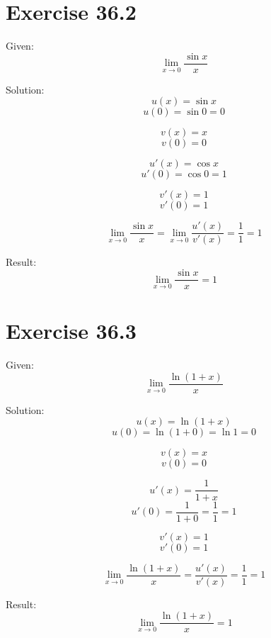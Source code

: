 \documentclass[a4paper, 10pt]{scrartcl}
\begin{document}
\section{Exercise 36.2}

Given:
\[\lim_{x\to 0}{\frac{\sin{x}}{x}}\]

Solution:
\[u(x) = \sin{x}\]
\[u(0) = \sin{0} = 0\]

\[v(x) = x\]
\[v(0) = 0\]

\[u'(x) = \cos{x}\]
\[u'(0) = \cos{0} = 1\]

\[v'(x) = 1\]
\[v'(0) = 1\]

\[\lim_{x\to 0}{\frac{\sin{x}}{x}} = \lim_{x\to 0}{\frac{u'(x)}{v'(x)}} = \frac{1}{1} = 1\]

Result:
\[\lim_{x\to 0}{\frac{\sin{x}}{x}} = 1\]

\section{Exercise 36.3}

Given:
\[\lim_{x\to 0}{\frac{\ln{(1 + x)}}{x}}\]

Solution:
\[u(x) = \ln{(1 + x)}\]
\[u(0) = \ln{(1 + 0)} = \ln{1} = 0\]

\[v(x) = x\]
\[v(0) = 0\]

\[u'(x) = \frac{1}{1 + x}\]
\[u'(0) = \frac{1}{1 + 0} = \frac{1}{1} = 1\]

\[v'(x) = 1\]
\[v'(0) = 1\]

\[\lim_{x\to 0}{\frac{\ln{(1 + x)}}{x}} = \frac{u'(x)}{v'(x)} = \frac{1}{1} = 1\]

Result:
\[\lim_{x\to 0}{\frac{\ln{(1 + x)}}{x}} = 1\]
\end{document}
